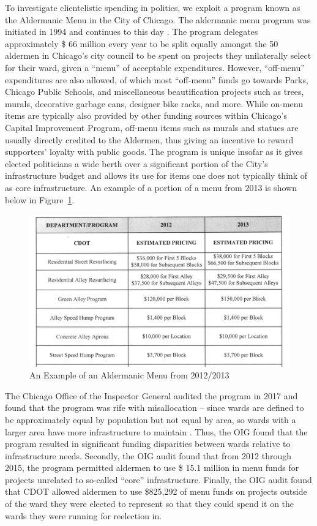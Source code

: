 To investigate clientelistic spending in politics, we exploit a program known as the Aldermanic Menu in the City of Chicago. 
The aldermanic menu program was initiated in 1994 and continues to this day \cite{OIGaudit}. 
The program delegates approximately \$ 66 million every year to be split equally amongst the 50 aldermen in Chicago's city council to be spent on projects they unilaterally select for their ward, given a ``menu'' of acceptable expenditures. 
However, ``off-menu'' expenditures are also allowed, of which most ``off-menu'' funds go towards Parks, Chicago Public Schools, and miscellaneous beautification projects such as trees, murals, decorative garbage cans, designer bike racks, and more\cite{OIGaudit}. 
While on-menu items are typically also provided by other funding sources within Chicago's Capital Improvement Program, off-menu items such as murals and statues are usually directly credited to the Aldermen, thus giving an incentive to reward supporters' loyalty with public goods.
The program is unique insofar as it gives elected politicians a wide berth over a significant portion of the City's infrastructure budget and allows its use for items one does not typically think of as core infrastructure. 
An example of a portion of a menu from 2013 is shown below in Figure~\ref*{fig:menu_example}.


\begin{figure}[H]
    \centering
    \caption{An Example of an Aldermanic Menu from 2012/2013}\label{fig:menu_example}
    \includegraphics[scale=0.38]{input/menu_example.png}
\end{figure}

The Chicago Office of the Inspector General audited the program in 2017 and found that the program was rife with misallocation -- since wards are defined to be approximately equal by population but not equal by area, so wards with a larger area have more infrastructure to maintain \cite{OIGaudit}.
Thus, the OIG found that the program resulted in significant funding disparities between wards relative to infrastructure needs.
Secondly, the OIG audit found that from 2012 through 2015, the program permitted aldermen to use \$ 15.1 million in menu funds for projects unrelated to so-called ``core'' infrastructure.
Finally, the OIG audit found that CDOT allowed aldermen to use \$825,292 of menu funds on projects outside of the ward they were elected to represent so that they could spend it on the wards they were running for reelection in.


